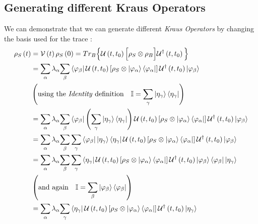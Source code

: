 \documentclass[a4paper,12pt]{article}
\begin{document}
\subsection{Generating different Kraus Operators}
We can demonstrate that we can generate different \textit{Kraus Operators} by changing the basis used for the trace : 
\begin{align}
	\rho_{S} \left(t\right) &= \mathcal{V}\left(t\right) \rho_{S} \left(0\right) = Tr_{B} \Big\{ \mathcal{U}\left(t, t_0\right) \Big[ \rho_{S} \otimes \rho_{B} \Big] \mathcal{U}^{\dagger}\left(t, t_0\right) \Big\} \\
	&=\sum_{\alpha}{\lambda_{\alpha} {\sum_{\beta} \bra{\varphi_{\beta}} \mathcal{U}\left(t, t_0\right) \left[ \rho_{S} \otimes \ket{\varphi_{\alpha}} \bra{\varphi_{\alpha}} \right]  \mathcal{U}^{\dagger}\left(t, t_0\right) \ket{\varphi_{\beta}} }} \notag \\
	&\left( \text{using the \textit{Identity} definition} \quad \mathbb{I} = \sum_{\gamma}{\ket{\eta_{\gamma}} \bra{\eta_{\gamma}} } \right) \notag \\
	&=\sum_{\alpha} {\lambda_{\alpha} {\sum_{\beta} \bra{\varphi_{\beta}} \left( \sum_{\gamma}{\ket{\eta_{\gamma}} \bra{\eta_{\gamma}} } \right) \mathcal{U}\left(t, t_0\right) \left[ \rho_{S} \otimes \ket{\varphi_{\alpha}} \bra{\varphi_{\alpha}} \right]  \mathcal{U}^{\dagger}\left(t, t_0\right) \ket{\varphi_{\beta}} }} \notag \\
	&=\sum_{\alpha} {\lambda_{\alpha} {\sum_{\beta} \sum_{\gamma} \bra{\varphi_{\beta}} \ket{\eta_{\gamma}} \bra{\eta_{\gamma}} \mathcal{U}\left(t, t_0\right) \left[ \rho_{S} \otimes \ket{\varphi_{\alpha}} \bra{\varphi_{\alpha}} \right]  \mathcal{U}^{\dagger}\left(t, t_0\right) \ket{\varphi_{\beta}} }} \notag \\
	&=\sum_{\alpha} {\lambda_{\alpha} {\sum_{\beta} \sum_{\gamma} \bra{\eta_{\gamma}} \mathcal{U}\left(t, t_0\right) \left[ \rho_{S} \otimes \ket{\varphi_{\alpha}} \bra{\varphi_{\alpha}} \right]  \mathcal{U}^{\dagger}\left(t, t_0\right) \ket{\varphi_{\beta}} \bra{\varphi_{\beta}} \ket{\eta_{\gamma}} }} \notag \\
	&\left( \text{and again} \quad \mathbb{I} = \sum_{\beta}{\ket{\varphi_{\beta}} \bra{\varphi_{\beta}} } \right) \notag \\
	&=\sum_{\alpha}{\lambda_{\alpha} {\sum_{\gamma} \bra{\eta_{\gamma}} \mathcal{U}\left(t, t_0\right) \left[ \rho_{S} \otimes \ket{\varphi_{\alpha}} \bra{\varphi_{\alpha}} \right]  \mathcal{U}^{\dagger}\left(t, t_0\right) \ket{\eta_{\gamma}} }} \notag \\
\end{align}
\end{document}
